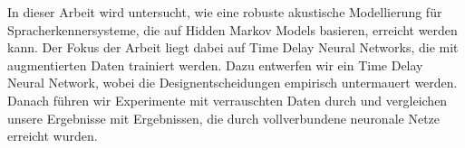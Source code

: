 
\abstract
In dieser Arbeit wird untersucht, wie eine robuste akustische Modellierung für Spracherkennersysteme, die auf Hidden Markov Models basieren, erreicht werden kann. Der Fokus der Arbeit liegt dabei auf Time Delay Neural Networks, die mit augmentierten Daten trainiert werden. Dazu entwerfen wir ein Time Delay Neural Network, wobei die Designentscheidungen empirisch untermauert werden. Danach führen wir Experimente mit verrauschten Daten durch und vergleichen unsere Ergebnisse mit Ergebnissen, die durch vollverbundene neuronale Netze erreicht wurden. 